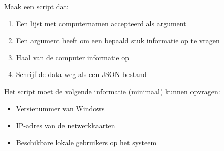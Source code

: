 Maak een script dat:
\begin{enumerate}
\item Een lijst met computernamen accepteerd als argument
\item Een argument heeft om een bepaald stuk informatie op te vragen
\item Haal van de computer informatie op
\item Schrijf de data weg als een JSON bestand
\end{enumerate}

Het script moet de volgende informatie (minimaal) kunnen opvragen:
\begin{itemize}
\item Versienummer van Windows
\item IP-adres van de netwerkkaarten
\item Beschikbare lokale gebruikers op het systeem
\end{itemize}

